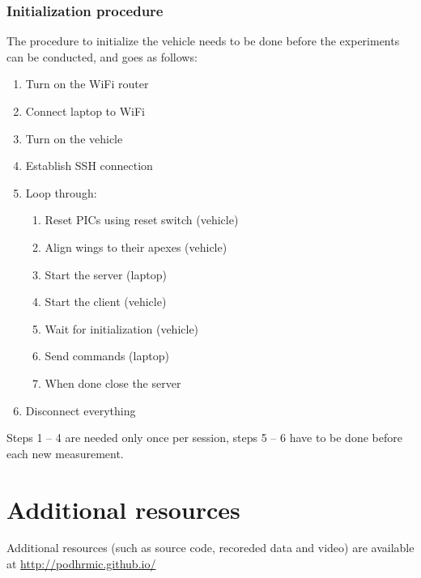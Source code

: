 \begin{appendix}
\newpage

\subsection{Initialization procedure}
The procedure to initialize the vehicle needs to be done before the experiments can be conducted, and goes as follows:

\begin{enumerate}
\item Turn on the WiFi router
\item Connect laptop to WiFi
\item Turn on the vehicle
\item Establish SSH connection
\item Loop through:
	\begin{enumerate}
	\item Reset PICs using reset switch (vehicle)
	\item Align wings to their apexes (vehicle)
	\item Start the server (laptop)
	\item Start the client (vehicle)
	\item Wait for initialization (vehicle)
	\item Send commands (laptop)
	\item When done close the server
	\end{enumerate}
\item Disconnect everything
\end{enumerate}

Steps 1 -- 4 are needed only once per session, steps 5 -- 6 have to be done before each new measurement.


\chapter{Additional resources}
\label{c:additional-resorces}

\begin{center}
Additional resources (such as source code, recoreded data and video) are available at \url{http://podhrmic.github.io/}
\end{center}

\end{appendix}

